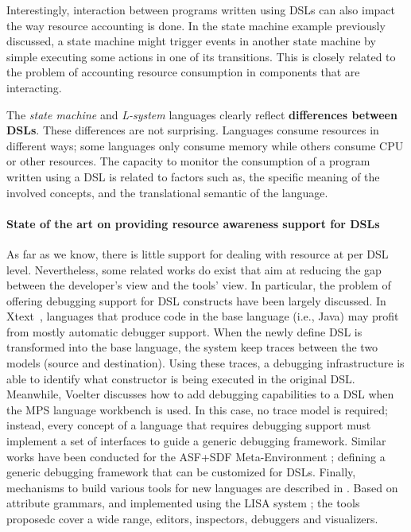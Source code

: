 Interestingly, interaction between programs written using DSLs can also impact the way resource accounting is done.
In the state machine example previously discussed, a state machine might trigger events in another state machine by simple executing some actions in one of its transitions.
This is closely related to the problem of accounting resource consumption in components that are interacting.

The \textit{state machine} and \textit{L-system} languages clearly reflect \textbf{differences between DSLs}.
These differences are not surprising.
Languages consume resources in different ways; some languages only consume memory while others consume CPU or other resources.
The capacity to monitor the consumption of a program written using a DSL is related to factors such as,
the specific meaning of the involved concepts,
and the translational semantic of the language.

\paragraph{State of the art on providing resource awareness support for DSLs}
As far as we know, there is little support for dealing with resource at per DSL level.
Nevertheless, some related works do exist that aim at reducing the gap between the developer's view and the tools' view.
In particular, the problem of offering debugging support for DSL constructs have been largely discussed.
In Xtext~\cite{Eysholdt:2010:XIY:1869542.1869625}, languages that produce code in the base language (i.e., Java) may profit from mostly automatic debugger support.
When the newly define DSL is transformed into the base language, the system keep traces between the two models (source and destination).
Using these traces, a debugging infrastructure is able to identify what constructor is being executed in the original DSL.
Meanwhile, Voelter \cite{Voelter2010} discusses how to add debugging capabilities to a DSL when the MPS language workbench is used.
In this case, no trace model is required; instead, every concept of a language that requires debugging support must implement a set of interfaces to guide a generic debugging framework.
Similar works have been conducted \cite{vandenBrand:2005:TGD:1705513.1705667} for the ASF+SDF Meta-Environment \cite{vandenBrand20013}; defining a generic debugging framework that can be customized for DSLs.
Finally, mechanisms to build various tools for new languages are described in \cite{Henriques2005}.
Based on attribute grammars, and implemented using the LISA system \cite{Mernik2002}; the tools proposedc cover a wide range, editors, inspectors, debuggers and visualizers.

